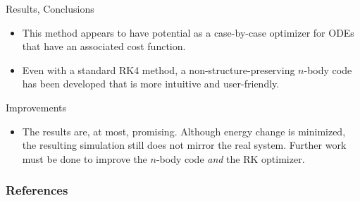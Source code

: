 \documentclass{beamer}
\begin{document}
\begin{frame}{Results, Conclusions}
    \begin{itemize}
        \item This method appears to have potential as a case-by-case optimizer
            for ODEs that have an associated cost function.
        \item Even with a standard RK4 method, a non-structure-preserving
            $n$-body code has been developed that is more intuitive and
            user-friendly.
    \end{itemize}
\end{frame}

\begin{frame}{Improvements}
    \begin{itemize}
        \item The results are, at most, promising. Although energy change is
            minimized, the resulting simulation still does not mirror the real
            system. Further work must be done to improve the $n$-body code
            \textit{and} the RK optimizer.
    \end{itemize}
\end{frame}

\begin{frame}[t,allowframebreaks]
    \frametitle{References}
    
\end{frame}
\end{document}
